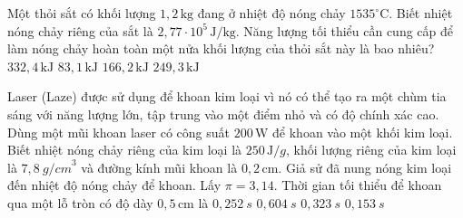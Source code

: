 \begin{ex}
Một thỏi sắt có khối lượng $1,2\,\mathrm{kg}$ đang ở nhiệt độ nóng chảy $1535^{\circ}\mathrm{C}$. Biết nhiệt nóng chảy riêng của sắt là $2,77\cdot 10^5\,\mathrm{J/kg}$. Năng lượng tối thiểu cần cung cấp để làm nóng chảy hoàn toàn một nửa khối lượng của thỏi sắt này là bao nhiêu?
\choice
{$332,4\,\mathrm{kJ}$}
{$83,1\,\mathrm{kJ}$}
{\True $166,2\,\mathrm{kJ}$}
{$249,3\,\mathrm{kJ}$}
\end{ex}

\begin{ex}
Laser (Laze) được sử dụng để khoan kim loại vì nó có thể tạo ra một chùm tia sáng với năng lượng lớn, tập trung vào một điểm nhỏ và có độ chính xác cao. Dùng một mũi khoan laser có công suất $200\,\text{W}$ để khoan vào một khối kim loại. Biết nhiệt nóng chảy riêng của kim loại là $250\,\text{J}/g$, khối lượng riêng của kim loại là $7,8\ {g/cm}^{3}$ và đường kính mũi khoan là $0,2\,\text{cm}$. Giả sử đã nung nóng kim loại đến nhiệt độ nóng chảy để khoan. Lấy $\pi = 3,14$. Thời gian tối thiểu để khoan qua một lỗ tròn có độ dày $0,5\,\text{cm}$ là
\choice
{$0,252\ s$}
{$0,604\ s$}
{$0,323\ s$}
{\True $0,153\ s$}
\end{ex}

